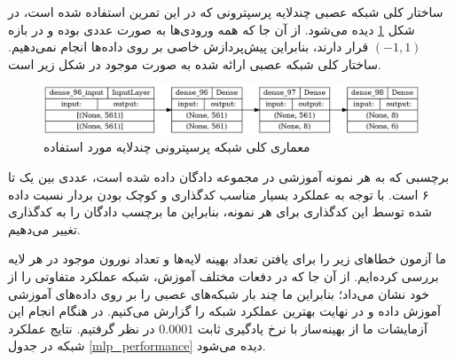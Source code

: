 \documentclass[12pt, a4paper]{article}
\begin{document}
ساختار کلی شبکه عصبی چندلایه پرسپترونی که در این تمرین استفاده شده است، در شکل \ref{mlp} دیده می‌شود.
از آن جا که همه ورودی‌ها به صورت عددی بوده و در بازه
$(-1,1)$ قرار دارند، بنابراین پیش‌پردازش خاصی بر روی داده‌ها انجام نمی‌دهیم.
ساختار کلی شبکه عصبی ارائه شده به صورت موجود در شکل زیر است.

\begin{figure}[h]
    \centering
    \includegraphics[width=0.8\linewidth]{images/mlp.png}
    \caption{معماری کلی شبکه پرسپترونی چندلایه مورد استفاده}
    \label{mlp}
\end{figure}

برچسبی که به هر نمونه آموزشی در مجموعه دادگان داده شده است، عددی بین یک تا ۶ است. با توجه به عملکرد بسیار مناسب
کدگذاری  و کوچک بودن بردار نسبت داده شده توسط این کدگذاری برای هر نمونه، بنابراین ما برچسب دادگان را
به کدگذاری  تغییر می‌دهیم.

ما آزمون خطاهای زیر را برای یافتن تعداد بهینه لایه‌ها و تعداد نورون موجود در هر لایه بررسی کرده‌ایم.
از آن جا که در دفعات مختلف آموزش، شبکه عملکرد متفاوتی را از خود نشان می‌داد؛ بنابراین ما چند بار
شبکه‌های عصبی را بر روی داده‌های آموزشی آموزش داده و در نهایت بهترین عملکرد شبکه را گزارش می‌کنیم.
در هنگام انجام این آزمایشات ما از بهینه‌ساز  با نرخ یادگیری ثابت $0.0001$ در نظر گرفتیم.
نتایج عملکرد شبکه در جدول \ref{mlp_performance} دیده می‌شود.
\end{document}
